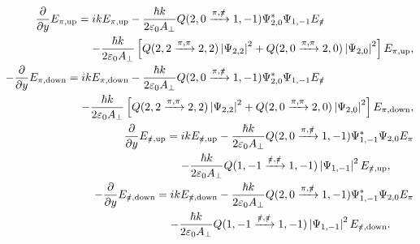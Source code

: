 \begin{subequations}
    \label{OpticalPumping:3LevelModel:ElectricFieldEvolution}
    \begin{align}
        \begin{split}
            \frac{\partial}{\partial y}E_{\pi, \text{up}} &= i k E_{\pi, \text{up}} - \frac{\hbar k}{2 \varepsilon_0 A_\perp} Q({2, 0 \xrightarrow{\pi,\pislash} 1, -1}) \Psi_{2, 0}^* \Psi_{1, -1} E_{\pislash}\\
            &\relphantom{=} - \frac{\hbar k}{2 \varepsilon_0 A_\perp} \left[Q({2, 2 \xrightarrow{\pi,\pi} 2, 2}) \abs{\Psi_{2, 2}}^2  + Q({2, 0 \xrightarrow{\pi,\pi} 2, 0}) \abs{\Psi_{2, 0}}^2 \right] E_{\pi, \text{up}},
        \end{split}\\
        \begin{split}
            -\frac{\partial}{\partial y}E_{\pi, \text{down}} &= i k E_{\pi, \text{down}} - \frac{\hbar k}{2 \varepsilon_0 A_\perp} Q({2, 0 \xrightarrow{\pi,\pislash} 1, -1}) \Psi_{2, 0}^* \Psi_{1, -1} E_{\pislash}\\
            &\relphantom{=} - \frac{\hbar k}{2 \varepsilon_0 A_\perp} \left[Q({2, 2 \xrightarrow{\pi,\pi} 2, 2}) \abs{\Psi_{2, 2}}^2  + Q({2, 0 \xrightarrow{\pi,\pi} 2, 0}) \abs{\Psi_{2, 0}}^2 \right] E_{\pi, \text{down}},
        \end{split}\\
        \begin{split}
            \frac{\partial}{\partial y}E_{\pislash, \text{up}} &= i k E_{\pislash, \text{up}} - \frac{\hbar k}{2 \varepsilon_0 A_\perp} Q({2, 0 \xrightarrow{\pi,\pislash} 1, -1}) \Psi_{1, -1}^* \Psi_{2, 0} E_{\pi} \\
            &\relphantom{=} - \frac{\hbar k}{2 \varepsilon_0 A_\perp} Q({1, -1 \xrightarrow{\pislash,\pislash} 1, -1}) \abs{\Psi_{1, -1}}^2 E_{\pislash, \text{up}} ,
        \end{split}\\
        \begin{split}
            -\frac{\partial}{\partial y}E_{\pislash, \text{down}} &= i k E_{\pislash, \text{down}} - \frac{\hbar k}{2 \varepsilon_0 A_\perp} Q({2, 0 \xrightarrow{\pi,\pislash} 1, -1}) \Psi_{1, -1}^* \Psi_{2, 0} E_{\pi} \\
            &\relphantom{=} - \frac{\hbar k}{2 \varepsilon_0 A_\perp} Q({1, -1 \xrightarrow{\pislash,\pislash} 1, -1}) \abs{\Psi_{1, -1}}^2 E_{\pislash, \text{down}}.
        \end{split}
\end{align}
\end{subequations}

